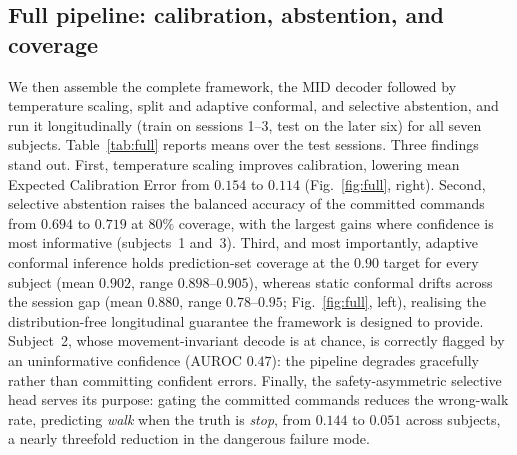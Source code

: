 \documentclass[journal]{IEEEtran}
\begin{document}
\subsection{Full pipeline: calibration, abstention, and coverage}
We then assemble the complete framework, the MID decoder followed by temperature
scaling, split and adaptive conformal, and selective abstention, and run it
longitudinally (train on sessions 1--3, test on the later six) for all seven
subjects. Table~\ref{tab:full} reports means over the test sessions. Three findings
stand out. First, temperature scaling improves calibration, lowering mean Expected
Calibration Error from $0.154$ to $0.114$ (Fig.~\ref{fig:full}, right). Second,
selective abstention raises the balanced accuracy of the committed commands from
$0.694$ to $0.719$ at $80\%$ coverage, with the largest gains where confidence is
most informative (subjects~1 and~3). Third, and most importantly, adaptive conformal
inference holds prediction-set coverage at the $0.90$ target for every subject (mean
$0.902$, range $0.898$--$0.905$), whereas static conformal drifts across the session
gap (mean $0.880$, range $0.78$--$0.95$; Fig.~\ref{fig:full}, left), realising the
distribution-free longitudinal guarantee the framework is designed to provide.
Subject~2, whose movement-invariant decode is at chance, is correctly flagged by an
uninformative confidence (AUROC $0.47$): the pipeline degrades gracefully rather
than committing confident errors. Finally, the safety-asymmetric selective head
serves its purpose: gating the committed commands reduces the wrong-walk rate,
predicting \emph{walk} when the truth is \emph{stop}, from $0.144$ to $0.051$ across
subjects, a nearly threefold reduction in the dangerous failure mode.
\end{document}
